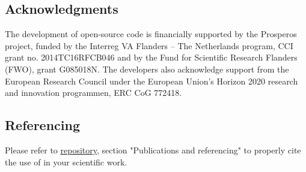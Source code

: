 \subsection{Acknowledgments}
The development of \biodeg{} open-source code is financially supported by the Prosperos project, funded by the Interreg VA Flanders – The Netherlands program, CCI grant no. 2014TC16RFCB046 and by the Fund for Scientific Research Flanders (FWO), grant G085018N. The developers also acknowledge support from the European Research Council under the European Union's Horizon 2020 research and innovation programmen, ERC CoG 772418.

\subsection{Referencing \biodeg{}}

Please refer to \href{https://github.com/mbarzegary/BioDeg}{\biodeg{} repository}, section "Publications and referencing" to properly cite the use of
\biodeg{} in your scientific work.
